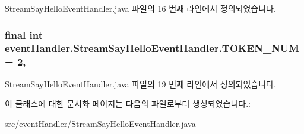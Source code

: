 Stream\+Say\+Hello\+Event\+Handler.\+java 파일의 16 번째 라인에서 정의되었습니다.

\hypertarget{classevent_handler_1_1_stream_say_hello_event_handler_af838acda55ea4de208e013ac0493364a}{
\subsubsection[{T\+O\+K\+E\+N\+\_\+\+N\+U\+M}]{\setlength{\rightskip}{0pt plus 5cm}final int event\+Handler.\+Stream\+Say\+Hello\+Event\+Handler.\+T\+O\+K\+E\+N\+\_\+\+N\+U\+M = 2\hspace{0.3cm}{\ttfamily [static]}, {\ttfamily [private]}}}\label{classevent_handler_1_1_stream_say_hello_event_handler_af838acda55ea4de208e013ac0493364a}


Stream\+Say\+Hello\+Event\+Handler.\+java 파일의 19 번째 라인에서 정의되었습니다.



이 클래스에 대한 문서화 페이지는 다음의 파일로부터 생성되었습니다.\+:\begin{DoxyCompactItemize}
\item 
src/event\+Handler/\hyperlink{_stream_say_hello_event_handler_8java}{Stream\+Say\+Hello\+Event\+Handler.\+java}\end{DoxyCompactItemize}
